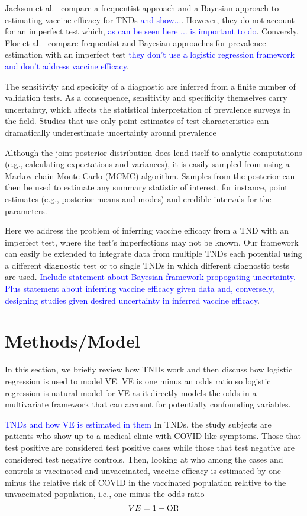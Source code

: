 \documentclass[11pt,notitlepage,twoside]{article}
\newcommand{\ej}[1]{\textcolor{blue}{#1}}
\begin{document}
Jackson et al.~\cite{jackson2021differences} compare a frequentist approach and a Bayesian approach to estimating vaccine efficacy for TNDs \ej{and show...}. However, they do not account for an imperfect test which, \ej{as can be seen here ... is important to do}. Conversly, Flor et al.~\cite{flor2020comparison} compare frequentist and Bayesian approaches for prevalence estimation with an imperfect test \ej{they don't use a logistic regression framework and don't address vaccine efficacy}.

The sensitivity and specicity of a diagnostic are inferred from a finite number of validation tests. As a consequence, sensitivity and specificity themselves carry uncertainty, which affects the statistical interpretation of prevalence surveys in the field. Studies that use only point estimates of test characteristics can dramatically underestimate uncertainty around prevalence 

Although the joint posterior distribution does lend itself to analytic computations (e.g., calculating expectations and variances), it is easily sampled from using a Markov chain Monte Carlo (MCMC) algorithm. Samples from the posterior can then be used to estimate any summary statistic of interest, for instance, point estimates (e.g., posterior means and modes) and credible intervals for the parameters. 

Here we address the problem of inferring vaccine efficacy from a TND with an imperfect test, where the test’s imperfections may not be known. Our framework can easily be extended to integrate data from multiple TNDs each potential using a different diagnostic test or to single TNDs in which different diagnostic tests are used. \ej{Include statement about Bayesian framework propogating uncertainty. Plus statement about inferring vaccine efficacy given data and, conversely, designing studies given desired uncertainty in inferred vaccine efficacy}. 

\section{Methods/Model}
In this section, we briefly review how TNDs work and then discuss how logistic regression is used to model VE. VE is one minus an odds ratio so logistic regression is natural model for VE as it directly models the odds in a multivariate framework that can account for potentially confounding variables.


\ej{TNDs and how VE is estimated in them}
In TNDs, the study subjects are patients who show up to a medical clinic with COVID-like symptoms. Those that test positive are considered test positive cases while those that test negative are considered test negative controls. Then, looking at who among the cases and controls is vaccinated and unvaccinated, vaccine efficacy is estimated by one minus the relative risk of COVID in the vaccinated population relative to the unvaccinated population, i.e., one minus the odds ratio
\[ VE = 1 - \text{OR} \]
\end{document}
